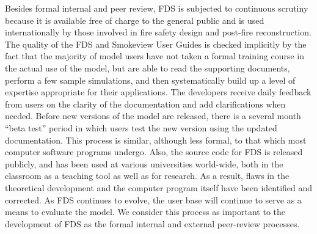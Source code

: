 \documentclass[11pt]{book}
\newcommand{\nopart}{\expandafter\def\csname Parent-1\endcsname{}} %
\begin{document}
Besides formal internal and peer review, FDS is subjected to continuous scrutiny because it is available free of charge to the general public and is
used internationally by those involved in fire safety design and post-fire reconstruction. The quality of the FDS and Smokeview User Guides is
checked implicitly by the fact that the majority of model users have not taken a formal training course in the actual use of the model, but are able
to read the supporting documents, perform a few sample simulations, and then systematically build up a level of expertise appropriate for their
applications. The developers receive daily feedback from users on the clarity of the documentation and add clarifications when needed. Before new
versions of the model are released, there is a several month ``beta test'' period in which users test the new version using the updated
documentation. This process is similar, although less formal, to that which most computer software programs undergo. Also, the source code for FDS is
released publicly, and has been used at various universities world-wide, both in the classroom as a teaching tool as well as for research. As a
result, flaws in the theoretical development and the computer program itself have been identified and corrected. As FDS continues to evolve, the user
base will continue to serve as a means to evaluate the model. We consider this process as important to the development of FDS as the formal internal
and external peer-review processes.









\backmatter
\nopart



\printindex
\end{document}
